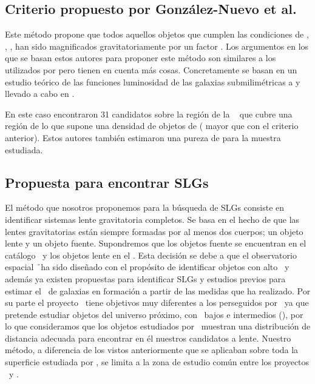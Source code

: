 \subsection{Criterio propuesto por González-Nuevo et al.}

Este método propone que todos aquellos objetos que cumplen las condiciones de , , ,  han sido magnificados gravitatoriamente por un factor . Los argumentos en los que se basan estos autores para proponer este método son similares a los utilizados por \cite{article:Negrello_2010} pero tienen en cuenta más cosas. Concretamente se basan en un estudio teórico de las funciones luminosidad de las galaxias submilimétricas a  y  llevado a cabo en \cite{article:Lapi_2011}.

En este caso encontraron 31 candidatos sobre la región de la \hatlas\  que cubre una región de  lo que supone una densidad de objetos de \linebreak {} ( mayor que con el criterio anterior). Estos autores también estimaron una pureza de  para la muestra estudiada.

\subsection{Propuesta para encontrar SLGs}\label{subsec:propuestas_slg}

El método que nosotros proponemos para la búsqueda de SLGs consiste en identificar sistemas lente gravitatoria completos. 
Se basa en el hecho de que las lentes gravitatorias están siempre formadas por al menos dos cuerpos; un objeto lente y un objeto fuente. 
Supondremos que los objetos fuente se encuentran en el catálogo \hatlas\ y los objetos lente en el \gama. Esta decisión se debe a que el observatorio espacial \h\ ha sido diseñado con el propósito de identificar objetos con alto \rt\ y además ya existen propuestas para identificar SLGs y estudios previos para estimar el \rt\ de galaxias en formación a partir de las medidas que ha realizado. Por su parte el proyecto \gama\ tiene objetivos muy diferentes a los perseguidos por \hatlas\ ya que pretende estudiar objetos del universo próximo, con \rt\ bajos e intermedios (), por lo que consideramos que los objetos estudiados por \gama\ muestran una distribución de distancia adecuada para encontrar en él nuestros candidatos a lente. Nuestro método, a diferencia de los vistos anteriormente que se aplicaban sobre toda la superficie estudiada por \hatlas, se limita a la zona de estudio común entre los proyectos \gama\ y \hatlas.


